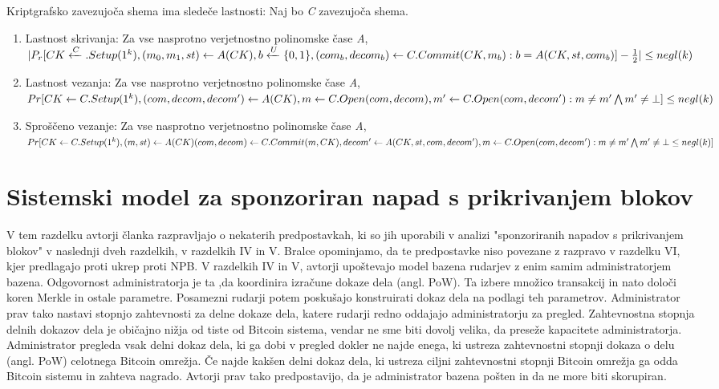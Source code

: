\documentclass{acm_proc_article-sp}
\begin{document}
\newline
\indent Kriptgrafsko zavezujoča shema ima sledeče lastnosti:
\indent Naj bo \textit{C} zavezujoča shema.
\begin{enumerate}
	\item Lastnost skrivanja: Za vse nasprotno verjetnostno polinomske čase \textit{A},
	$|P_r[CK \xleftarrow C.Setup(1^k),(m_0,m_1,st) \leftarrow A(CK), b \xleftarrow{U}  \\ \{0,1\},(com_b, decom_b) \leftarrow C.Commit(CK,m_b) : b = A(CK,st,com_b)] - \frac{1}{2}|  \le negl(k)$
	\item Lastnost vezanja: Za vse nasprotno verjetnostno polinomske čase \textit{A},
	$ Pr[CK \leftarrow \\ C.Setup(1^k),(com,decom,decom') \leftarrow A(CK),m \leftarrow C.Open(com,decom), m' \leftarrow \\ C.Open(com,decom') : m \ne m' \bigwedge m' \ne \bot ] \le negl(k)  $
	\item Sproščeno vezanje: Za vse nasprotno verjetnostno polinomske čase \textit{A},
	$ Pr[CK \leftarrow C.Setup(1^k) , (m,st) \leftarrow A(CK) (com,decom) \leftarrow C.Commit(m,CK), decom' \leftarrow A(CK,st,com,decom'), m \leftarrow \\ C.Open(com,decom') : m \ne m' \bigwedge m' \ne \bot \le negl(k)] $
\end{enumerate}

\section{Sistemski model  za sponzoriran napad s prikrivanjem blokov}\label{sekcija3}

V tem razdelku avtorji članka razpravljajo  o nekaterih predpostavkah, ki so jih uporabili v analizi "sponzoriranih napadov s prikrivanjem blokov" v naslednji dveh razdelkih, v razdelkih IV in V. Bralce opominjamo, da te predpostavke niso povezane z razpravo v razdelku VI, kjer predlagajo proti ukrep proti NPB. V razdelkih IV in V, avtorji upoštevajo model bazena rudarjev z enim samim administratorjem bazena. Odgovornost administratorja je ta ,da koordinira izračune dokaze dela (angl. PoW). Ta izbere množico transakcij in nato določi koren Merkle in ostale parametre. Posamezni rudarji potem poskušajo konstruirati dokaz dela na podlagi teh parametrov. Administrator prav tako nastavi stopnjo zahtevnosti za delne dokaze dela, katere rudarji redno oddajajo administratorju za pregled. Zahtevnostna stopnja delnih dokazov dela je običajno nižja od tiste od Bitcoin sistema, vendar ne sme biti dovolj velika, da preseže kapacitete administratorja. Administrator pregleda vsak delni dokaz dela, ki ga dobi v pregled dokler ne najde enega, ki ustreza zahtevnostni stopnji dokaza o delu (angl. PoW) celotnega Bitcoin omrežja. Če najde kakšen delni dokaz dela, ki ustreza ciljni zahtevnostni stopnji Bitcoin omrežja ga odda Bitcoin sistemu in zahteva nagrado. Avtorji prav tako predpostavijo, da je administrator bazena pošten in da ne more biti skorupiran.
\end{document}
